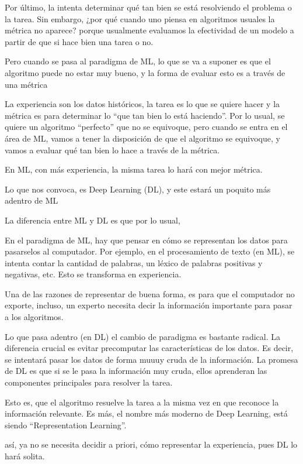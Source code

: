 Por último, la  intenta determinar qué tan bien se está resolviendo el problema o la tarea. Sin embargo, ¿por qué cuando uno piensa en algoritmos usuales la métrica no aparece? porque usualmente evaluamos la efectividad de un modelo a partir de que si hace bien una tarea o no.

Pero cuando se pasa al paradigma de ML, lo que se va a suponer es que el algoritmo puede no estar muy bueno, y la forma de evaluar esto es a través de una métrica

La experiencia son los datos históricos, la tarea es lo que se quiere hacer y la métrica es para determinar lo ``que tan bien lo está haciendo''. Por lo usual, se quiere un algoritmo ``perfecto'' que no se equivoque, pero cuando se entra en el área de ML, vamos a tener la disposición de que el algoritmo se equivoque, y vamos a evaluar qué tan bien lo hace  a través de la métrica.

En ML, con más experiencia, la misma tarea lo hará con mejor métrica.

Lo que nos convoca, es Deep Learning (DL), y este estará un poquito más adentro de ML


La diferencia entre ML y DL es que por lo usual, 

En el paradigma de ML, hay que pensar en cómo se representan los datos para pasarselos al computador. Por ejemplo, en el procesamiento de texto (en ML), se intenta contar la cantidad de palabras, un léxico de palabras positivas y negativas, etc. Esto se transforma en experiencia.

Una de las razones de representar de buena forma, es para que el computador no exporte, incluso, un experto necesita decir la información importante para pasar a los algoritmos.

Lo que pasa adentro (en DL) el cambio de paradigma es bastante radical. La diferencia crucial es evitar precomputar las características de los datos. Es decir, se intentará pasar los datos de forma muuuy cruda de la información. La promesa de DL es que si se le pasa la información muy cruda, ellos aprenderan las componentes principales para resolver la tarea.

Esto es, que el algoritmo resuelve la tarea a la misma vez en que reconoce la información relevante. Es más, el nombre más moderno de Deep Learning, está siendo ``Representation Learning''.

así, ya no se necesita decidir a priori, cómo representar la experiencia, pues DL lo hará solita.

